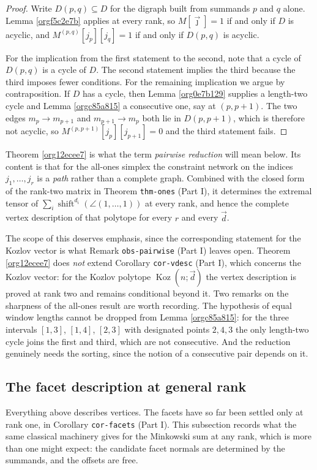\documentclass[11pt, a4paper, abstract=yes]{scrartcl}
\theoremstyle{definition}
\theoremstyle{remark}
\theoremstyle{plain}
\newcommand{\Koz}{\operatorname{Koz}}
\newcommand{\shift}{\operatorname{shift}}
\begin{document}
\begin{proof}
Write \(D(p,q)\subseteq D\) for the digraph built from summands \(p\) and \(q\) alone. Lemma
\ref{orgf5c2e7b} applies at every rank, so \(M[\vec\jmath]=1\) if and only if \(D\) is acyclic, and
\(M^{(p,q)}[j_p][j_q]=1\) if and only if \(D(p,q)\) is acyclic.

For the implication from the first statement to the second, note that a cycle of \(D(p,q)\) is a
cycle of \(D\). The second statement implies the third because the third imposes fewer conditions.
For the remaining implication we argue by contraposition. If \(D\) has a cycle, then Lemma
\ref{org0e7b129} supplies a length-two cycle and Lemma \ref{orgc85a815} a consecutive one, say at
\((p,p+1)\). The two edges \(m_p\to m_{p+1}\) and \(m_{p+1}\to m_p\) both lie in \(D(p,p+1)\), which
is therefore not acyclic, so \(M^{(p,p+1)}[j_p][j_{p+1}]=0\) and the third statement fails.
\end{proof}

Theorem \ref{org12ecee7} is what the term \emph{pairwise reduction} will mean below. Its content is
that for the all-ones simplex the constraint network on the indices \(j_1,\dots,j_r\) is a \emph{path}
rather than a complete graph. Combined with the closed form of the rank-two matrix in Theorem
\texttt{thm-ones} (Part I), it determines the extremal tensor of \(\sum_i\shift^{d_i}(\angle(1,\dots,1))\) at every
rank, and hence the complete vertex description of that polytope for every \(r\) and every
\(\vec d\).

The scope of this deserves emphasis, since the corresponding statement for the Kozlov vector is
what Remark \texttt{obs-pairwise} (Part I) leaves open. Theorem \ref{org12ecee7} does \emph{not} extend Corollary
\texttt{cor-vdesc} (Part I), which concerns the Kozlov vector: for the Kozlov polytope \(\Koz(n;\vec d)\) the vertex
description is proved at rank two and remains conditional beyond it. Two remarks on the sharpness
of the all-ones result are worth recording. The hypothesis of equal
window lengths cannot be dropped from Lemma \ref{orgc85a815}: for the three intervals \([1,3]\),
\([1,4]\), \([2,3]\) with designated points \(2,4,3\) the only length-two cycle joins the first and
third, which are not consecutive. And the reduction genuinely needs the sorting, since the notion of
a consecutive pair depends on it.
\subsection{The facet description at general rank}
\label{sec:org970dea6}
Everything above describes vertices. The facets have so far been settled only at rank one, in
Corollary \texttt{cor-facets} (Part I). This subsection records what the same classical machinery gives for the
Minkowski sum at any rank, which is more than one might expect: the candidate facet normals are
determined by the summands, and the offsets are free.
\end{document}
